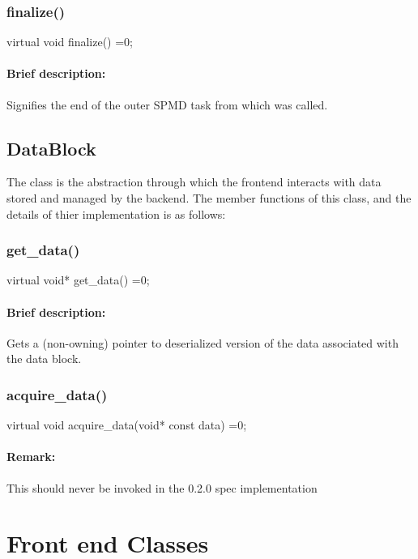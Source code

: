 \subsubsection{finalize()}
\begin{CppCode}
    virtual void
    finalize() =0;
\end{CppCode}

\paragraph{Brief description:} Signifies the end of the outer SPMD task from which  was called.
     



\subsection{{DataBlock}}

The  class is the abstraction through which the frontend interacts with data stored and managed by the backend. The 
member functions of this class, and the details of thier implementation is as follows:

\subsubsection{get\_data()}
\begin{CppCode}
    virtual void*
    get_data() =0;
\end{CppCode}

\paragraph{Brief description:} Gets a (non-owning) pointer to deserialized version of the data associated with
      the data block.


\subsubsection{acquire\_data()}
\begin{CppCode}
    virtual void
    acquire_data(void* const data) =0;
\end{CppCode}

\paragraph{Remark:} This should never be invoked in the 0.2.0 spec implementation



\section{Front end Classes}

